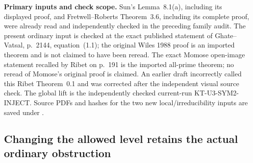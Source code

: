 \documentclass[11pt,a4paper]{article}
\theoremstyle{definition}
\renewcommand{\paragraph}[1]{\par\smallskip\noindent\textbf{#1}\quad\ignorespaces}
\begin{document}
\paragraph{Primary inputs and check scope.}
Sun's Lemma~8.1(a), including its displayed proof, and
Fretwell--Roberts Theorem~3.6, including its complete proof,
were already read and independently checked in the preceding
family audit. The present ordinary input is checked at the
exact published statement of Ghate--Vatsal, p.~2144,
equation~(1.1); the original Wiles 1988 proof is an imported
theorem and is not claimed to have been reread. The exact
Momose open-image statement recalled by Ribet on p.~191
is the imported all-prime theorem; no reread of Momose's
original proof is claimed. An earlier draft incorrectly
called this Ribet Theorem~0.1 and was corrected after the
independent visual source check. The global lift is the independently
checked current-run KT-U3-SYM2-INJECT. Source PDFs and
hashes for the two new local/irreducibility inputs are
saved under .



\subsection{Changing the allowed level retains the actual ordinary obstruction}
\end{document}
